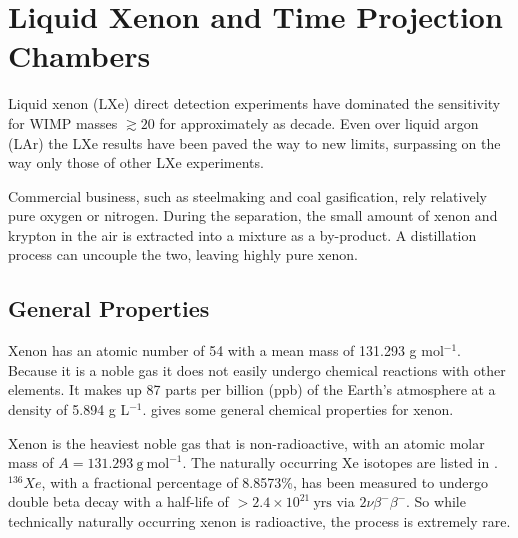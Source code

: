 

\pagestyle{cu}
\graphicspath{{./Chapter2/Figures/}}
\chapter[Liquid Xenon and Time Projection Chambers][Liquid Xenon and Time Projection Chambers]{Liquid Xenon and Time Projection Chambers}
\label{chap:liquid_xe}

Liquid xenon (LXe) direct detection experiments have dominated the sensitivity for WIMP masses $\gtrsim 20$ for approximately as
decade.  Even over liquid argon (LAr) the LXe results have been paved the way to new limits, surpassing on the way only those of other
LXe experiments.

Commercial business, such as steelmaking and coal gasification, rely relatively pure oxygen or nitrogen.  During the separation,
the small amount of xenon and krypton in the air is extracted into a mixture as a by-product.  A distillation process can uncouple
the two, leaving highly pure xenon.

\section{General Properties}
\label{sec:properties}
Xenon has an atomic number of 54 with a mean mass of 131.293 g mol$^{-1}$.  Because it is a noble gas it does not easily undergo chemical
reactions with other elements.  It makes up 87 parts per billion (ppb) of the Earth's atmosphere at a density of
5.894 g L$^{-1}$.   gives some general chemical properties for xenon.

Xenon is the heaviest noble gas that is non-radioactive, with an atomic molar mass of $A = 131.293\ \mathrm{g\ mol^{-1}}$.  The naturally
occurring Xe isotopes are listed in
.  $^{136}Xe$, with a fractional percentage of 8.8573\%,
has been measured to undergo double beta decay with a half-life of $> 2.4 \times 10^{21}\ \mathrm{yrs}$ via
$2\nu \beta^{-} \beta^{-}$.  So while technically naturally occurring xenon is radioactive, the process is extremely rare.

